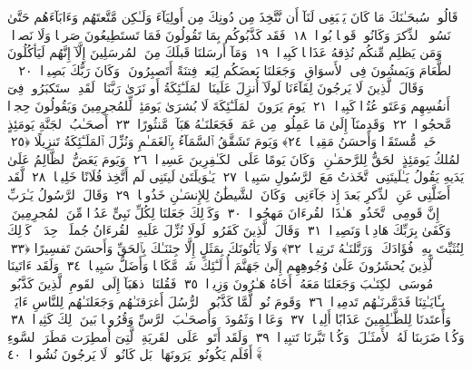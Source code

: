  قَالُوا۟ سُبحَـٰنَكَ مَا كَانَ يَنۢبَغِى لَنَآ أَن نَّتَّخِذَ مِن دُونِكَ مِن أَولِيَآءَ وَلَـٰكِن مَّتَّعتَهُم وَءَابَآءَهُم حَتَّىٰ نَسُوا۟ ٱلذِّكرَ وَكَانُوا۟ قَومًۢا بُورًۭا ﴿١٨﴾
 فَقَد كَذَّبُوكُم بِمَا تَقُولُونَ فَمَا تَستَطِيعُونَ صَرفًۭا وَلَا نَصرًۭا ۚ وَمَن يَظلِم مِّنكُم نُذِقهُ عَذَابًۭا كَبِيرًۭا ﴿١٩﴾
 وَمَآ أَرسَلنَا قَبلَكَ مِنَ ٱلمُرسَلِينَ إِلَّآ إِنَّهُم لَيَأكُلُونَ ٱلطَّعَامَ وَيَمشُونَ فِى ٱلأَسوَاقِ ۗ وَجَعَلنَا بَعضَكُم لِبَعضٍۢ فِتنَةً أَتَصبِرُونَ ۗ وَكَانَ رَبُّكَ بَصِيرًۭا ﴿٢٠﴾
 ۞ وَقَالَ ٱلَّذِينَ لَا يَرجُونَ لِقَآءَنَا لَولَآ أُنزِلَ عَلَينَا ٱلمَلَـٰٓئِكَةُ أَو نَرَىٰ رَبَّنَا ۗ لَقَدِ ٱستَكبَرُوا۟ فِىٓ أَنفُسِهِم وَعَتَو عُتُوًّۭا كَبِيرًۭا ﴿٢١﴾
 يَومَ يَرَونَ ٱلمَلَـٰٓئِكَةَ لَا بُشرَىٰ يَومَئِذٍۢ لِّلمُجرِمِينَ وَيَقُولُونَ حِجرًۭا مَّحجُورًۭا ﴿٢٢﴾
 وَقَدِمنَآ إِلَىٰ مَا عَمِلُوا۟ مِن عَمَلٍۢ فَجَعَلنَـٰهُ هَبَآءًۭ مَّنثُورًا ﴿٢٣﴾
 أَصحَـٰبُ ٱلجَنَّةِ يَومَئِذٍ خَيرٌۭ مُّستَقَرًّۭا وَأَحسَنُ مَقِيلًۭا ﴿٢٤﴾
 وَيَومَ تَشَقَّقُ ٱلسَّمَآءُ بِٱلغَمَـٰمِ وَنُزِّلَ ٱلمَلَـٰٓئِكَةُ تَنزِيلًا ﴿٢٥﴾
 ٱلمُلكُ يَومَئِذٍ ٱلحَقُّ لِلرَّحمَـٰنِ ۚ وَكَانَ يَومًا عَلَى ٱلكَـٰفِرِينَ عَسِيرًۭا ﴿٢٦﴾
 وَيَومَ يَعَضُّ ٱلظَّالِمُ عَلَىٰ يَدَيهِ يَقُولُ يَـٰلَيتَنِى ٱتَّخَذتُ مَعَ ٱلرَّسُولِ سَبِيلًۭا ﴿٢٧﴾
 يَـٰوَيلَتَىٰ لَيتَنِى لَم أَتَّخِذ فُلَانًا خَلِيلًۭا ﴿٢٨﴾
 لَّقَد أَضَلَّنِى عَنِ ٱلذِّكرِ بَعدَ إِذ جَآءَنِى ۗ وَكَانَ ٱلشَّيطَٰنُ لِلإِنسَـٰنِ خَذُولًۭا ﴿٢٩﴾
 وَقَالَ ٱلرَّسُولُ يَـٰرَبِّ إِنَّ قَومِى ٱتَّخَذُوا۟ هَـٰذَا ٱلقُرءَانَ مَهجُورًۭا ﴿٣٠﴾
 وَكَذَٟلِكَ جَعَلنَا لِكُلِّ نَبِىٍّ عَدُوًّۭا مِّنَ ٱلمُجرِمِينَ ۗ وَكَفَىٰ بِرَبِّكَ هَادِيًۭا وَنَصِيرًۭا ﴿٣١﴾
 وَقَالَ ٱلَّذِينَ كَفَرُوا۟ لَولَا نُزِّلَ عَلَيهِ ٱلقُرءَانُ جُملَةًۭ وَٟحِدَةًۭ ۚ كَذَٟلِكَ لِنُثَبِّتَ بِهِۦ فُؤَادَكَ ۖ وَرَتَّلنَـٰهُ تَرتِيلًۭا ﴿٣٢﴾
 وَلَا يَأتُونَكَ بِمَثَلٍ إِلَّا جِئنَـٰكَ بِٱلحَقِّ وَأَحسَنَ تَفسِيرًا ﴿٣٣﴾
 ٱلَّذِينَ يُحشَرُونَ عَلَىٰ وُجُوهِهِم إِلَىٰ جَهَنَّمَ أُو۟لَـٰٓئِكَ شَرٌّۭ مَّكَانًۭا وَأَضَلُّ سَبِيلًۭا ﴿٣٤﴾
 وَلَقَد ءَاتَينَا مُوسَى ٱلكِتَـٰبَ وَجَعَلنَا مَعَهُۥٓ أَخَاهُ هَـٰرُونَ وَزِيرًۭا ﴿٣٥﴾
 فَقُلنَا ٱذهَبَآ إِلَى ٱلقَومِ ٱلَّذِينَ كَذَّبُوا۟ بِـَٔايَـٰتِنَا فَدَمَّرنَـٰهُم تَدمِيرًۭا ﴿٣٦﴾
 وَقَومَ نُوحٍۢ لَّمَّا كَذَّبُوا۟ ٱلرُّسُلَ أَغرَقنَـٰهُم وَجَعَلنَـٰهُم لِلنَّاسِ ءَايَةًۭ ۖ وَأَعتَدنَا لِلظَّـٰلِمِينَ عَذَابًا أَلِيمًۭا ﴿٣٧﴾
 وَعَادًۭا وَثَمُودَا۟ وَأَصحَـٰبَ ٱلرَّسِّ وَقُرُونًۢا بَينَ ذَٟلِكَ كَثِيرًۭا ﴿٣٨﴾
 وَكُلًّۭا ضَرَبنَا لَهُ ٱلأَمثَـٰلَ ۖ وَكُلًّۭا تَبَّرنَا تَتبِيرًۭا ﴿٣٩﴾
 وَلَقَد أَتَوا۟ عَلَى ٱلقَريَةِ ٱلَّتِىٓ أُمطِرَت مَطَرَ ٱلسَّوءِ ۚ أَفَلَم يَكُونُوا۟ يَرَونَهَا ۚ بَل كَانُوا۟ لَا يَرجُونَ نُشُورًۭا ﴿٤٠﴾
